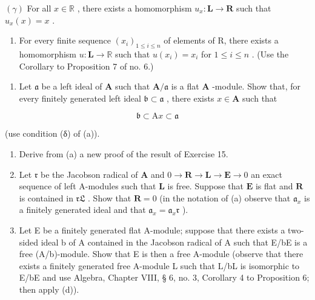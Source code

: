 \((\gamma)\) For all \(x \in \mathbb{R}\) , there exists a homomorphism \(u_x: \mathbf{L} \to \mathbf{R}\) such that \(u_x(x) = x\) .

\begin{enumerate}
\def\labelenumi{(\arabic{enumi})}
\setcounter{enumi}{7}
\tightlist
\item
  For every finite sequence \((x_{i})_{1\leqslant i\leqslant n}\) of elements of R, there exists a homomorphism \(u\colon \mathbf{L}\to \mathbb{R}\) such that \(u(x_{i}) = x_{i}\) for \(1\leqslant i\leqslant n\) . (Use the Corollary to Proposition 7 of no. 6.)
\end{enumerate}

\begin{enumerate}
\def\labelenumi{(\alph{enumi})}
\setcounter{enumi}{1}
\tightlist
\item
  Let \(\mathfrak{a}\) be a left ideal of \(\mathbf{A}\) such that \(\mathbf{A} / \mathfrak{a}\) is a flat \(\mathbf{A}\) -module. Show that, for every finitely generated left ideal \(\mathfrak{b} \subset \mathfrak{a}\) , there exists \(x \in \mathbf{A}\) such that
\end{enumerate}

\[
\mathfrak {b} \subset \mathrm{A} x \subset \mathfrak {a}
\]

(use condition (δ) of (a)).

\begin{enumerate}
\def\labelenumi{(\alph{enumi})}
\setcounter{enumi}{2}
\item
  Derive from (a) a new proof of the result of Exercise 15.
\item
  Let \(\mathfrak{r}\) be the Jacobson radical of \(\mathbf{A}\) and \(0 \to \mathbf{R} \to \mathbf{L} \to \mathbf{E} \to 0\) an exact sequence of left A-modules such that \(\mathbf{L}\) is free. Suppose that \(\mathbf{E}\) is flat and \(\mathbf{R}\) is contained in \(\mathfrak{rL}\) . Show that \(\mathbf{R} = 0\) (in the notation of (a) observe that \(\mathfrak{a}_x\) is a finitely generated ideal and that \(\mathfrak{a}_x = \mathfrak{a}_x\mathfrak{r}\) ).
\item
  Let E be a finitely generated flat A-module; suppose that there exists a two-sided ideal b of A contained in the Jacobson radical of A such that E/bE is a free (A/b)-module. Show that E is then a free A-module (observe that there exists a finitely generated free A-module L such that L/bL is isomorphic to E/bE and use Algebra, Chapter VIII, § 6, no. 3, Corollary 4 to Proposition 6; then apply (d)).
\end{enumerate}


